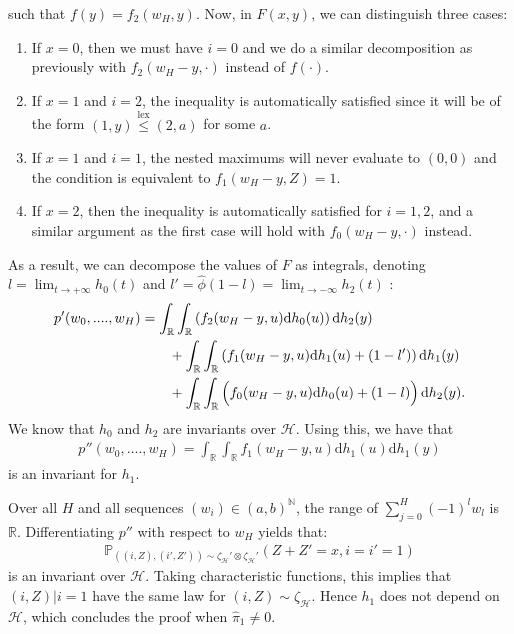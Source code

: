 \documentclass[11pt]{article}
\DeclareMathOperator{\lex}{lex}
\begin{document}
such that $f(y)=f_2(w_H,y)$.
Now, in $F(x,y)$, we can distinguish three cases:
\begin{enumerate}
    \item If $x=0$, then we must have $i=0$ and we do a similar decomposition as previously with $f_2(w_H-y,\cdot)$ instead of $f(\cdot)$.
    \item If $x=1$ and $i=2$, the inequality is automatically satisfied since it will be of the form $(1,y) \overset{\lex}{\leq}(2,a)$ for some $a$.
    \item If $x=1$ and $i=1$, the nested maximums will never evaluate to $(0,0)$ and the condition is equivalent to $f_1(w_H-y,Z)=1$.
    \item If $x=2$, then the inequality is automatically satisfied for $i=1,2$, and a similar argument as the first case will hold with $f_0(w_H-y,\cdot)$ instead.
\end{enumerate}
As a result, we can decompose the values of $F$ as integrals, denoting $l=\lim_{t \rightarrow +\infty}h_0(t)$ and $l'=\hat{\phi}(1-l)=\lim_{t \rightarrow -\infty}h_2(t)$ :
\begin{align*}
    p'(w_0,....,w_H)&= \int_{\mathbb{R}}\int_{\mathbb{R}}\left(f_2(w_H-y,u)\mathrm{d}h_0(u)\right)\mathrm{d}h_2(y) \\
    & \qquad + \int_{\mathbb{R}}\int_{\mathbb{R}}\left(f_1(w_H-y,u)\mathrm{d}h_1(u) + (1-l') \right)\mathrm{d}h_1(y) \\
    & \qquad + \int_{\mathbb{R}}\int_{\mathbb{R}}\left(f_0(w_H-y,u)\mathrm{d}h_0(u)+ (1-l)   \vphantom{h_\frac{1}{2}} \right)\mathrm{d}h_2(y).
\end{align*}
We know that $h_0$ and $h_2$ are invariants over ${\mathcal{H}}$. Using this, we have that
\begin{align*}
    p''(w_0,....,w_H) =\int_{\mathbb{R}}\int_{\mathbb{R}}f_1(w_H-y,u)\mathrm{d}h_1(u)\mathrm{d}h_1(y) 
\end{align*}
is an invariant for $h_1$.

Over all $H$ and all sequences $(w_i)\in (a,b)^{\mathbb{N}}$, the range of $\sum_{j=0}^{H}(-1)^lw_l$ is $\mathbb{R}$. Differentiating $p''$ with respect to $w_H$ yields that:
\begin{align*}
    \mathbb{P}_{((i,Z),(i',Z')) \sim \zeta_{\mathcal{H}}'\otimes \zeta_{\mathcal{H}}'}\left( Z+Z'=x , i=i'=1 \right)
\end{align*}
is an invariant over ${\mathcal{H}}$.
Taking characteristic functions, this implies that $(i,Z) | i=1$ have the same law for $(i,Z) \sim \zeta_{\mathcal{H}}$. Hence $h_1$ does not depend on $\mathcal H$, which concludes the proof when $\hat{\pi}_1 \neq 0$.
\end{document}

